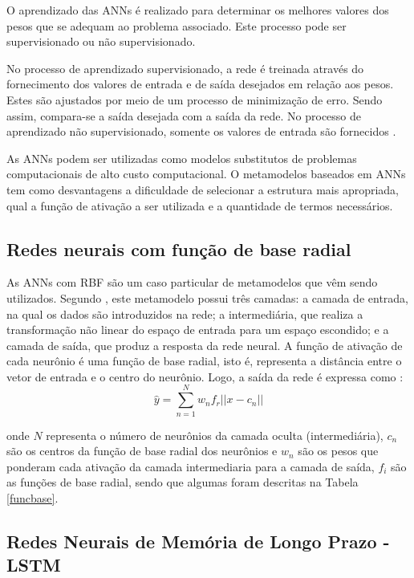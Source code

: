 O aprendizado das ANNs é realizado para determinar os melhores valores dos pesos que se adequam ao problema associado. Este processo pode ser supervisionado ou não supervisionado. 

No processo de aprendizado supervisionado, a rede é treinada através do fornecimento dos valores de entrada e de saída desejados em relação aos pesos. Estes são ajustados por meio de um processo de minimização de erro. Sendo assim, compara-se a saída desejada com a saída da rede. No processo de aprendizado não supervisionado, somente os valores de entrada são fornecidos \cite{PINA2010}.

As ANNs podem ser utilizadas como modelos substitutos de problemas computacionais de alto custo computacional. O metamodelos baseados em ANNs tem como desvantagens a dificuldade de selecionar a estrutura mais apropriada, qual a função de ativação a ser utilizada e a quantidade de termos necessários.

\subsection{Redes neurais com função de base radial}

As ANNs com RBF são um caso particular de metamodelos que vêm sendo utilizados. Segundo , este metamodelo possui três camadas: a camada de entrada, na qual os dados são introduzidos na rede; a intermediária, que realiza a transformação não linear do espaço de entrada para um espaço escondido; e a camada de saída, que produz a resposta da rede neural. A função de ativação de cada neurônio é uma função de base radial, isto é, representa a distância entre o vetor de entrada e o centro do neurônio. Logo, a saída da rede é expressa como \cite{viana2008,fonseca2009}:
\begin{equation}
\hat{y}= \sum_{n=1}^{N}w_n{f}_r{||x-{c_n}||}
\label{eq:10}
\end{equation}

\noindent onde $N$ representa o número de neurônios da camada oculta (intermediária), ${c}_n$ são os centros da função de base radial dos neurônios e ${w}_n$ são os pesos que ponderam cada ativação da camada intermediaria para a camada de saída, ${f}_i$ são as funções de base radial, sendo que algumas foram descritas na Tabela \ref{funcbase}.

\subsection{Redes Neurais de Memória de Longo Prazo - LSTM}

